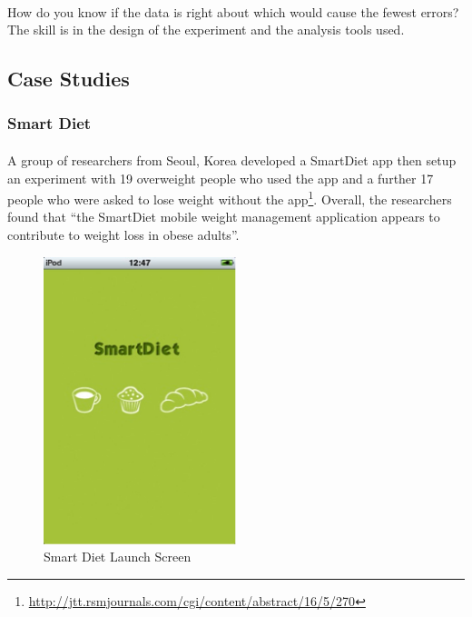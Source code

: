 \paragraph{} How do you know if the data is right about which would cause the fewest errors?  The skill is in the design of the experiment and the analysis tools used.

\subsection{Case Studies}
\subsubsection{Smart Diet}

\paragraph{} A group of researchers from Seoul, Korea developed a SmartDiet app then setup an experiment with 19 overweight people who used the app and a further 17 people who were asked to lose weight without the app\footnote{\url{http://jtt.rsmjournals.com/cgi/content/abstract/16/5/270}}. Overall, the researchers found that ``the SmartDiet mobile weight management application appears to contribute to weight loss in obese adults''.

\begin{figure}[H]
\centering
\includegraphics[width=0.5\textwidth]{images/smart-diet-1}
\caption{Smart Diet Launch Screen}
\label{fig:smart-diet-1}
\end{figure}

